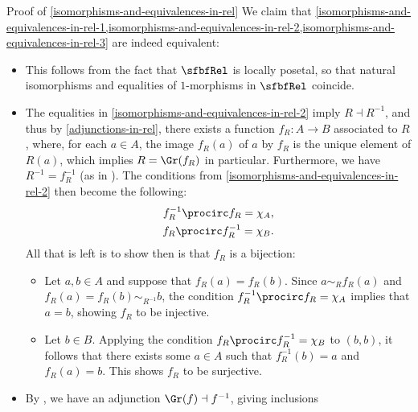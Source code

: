 \begin{Proof}{Proof of \cref{isomorphisms-and-equivalences-in-rel}}%
    We claim that \cref{isomorphisms-and-equivalences-in-rel-1,isomorphisms-and-equivalences-in-rel-2,isomorphisms-and-equivalences-in-rel-3} are indeed equivalent:
    \begin{itemize}
        \item{}This follows from the fact that $\sfbfRel$ is locally posetal, so that natural isomorphisms and equalities of $1$-morphisms in $\sfbfRel$ coincide.
        \item{}The equalities in \cref{isomorphisms-and-equivalences-in-rel-2} imply $R\dashv R^{-1}$, and thus by \cref{adjunctions-in-rel}, there exists a function $f_{R}\colon A\to B$ associated to $R$, where, for each $a\in A$, the image $f_{R}(a)$ of $a$ by $f_{R}$ is the unique element of $R(a)$, which implies $R=\Gr(f_{R})$ in particular. Furthermore, we have $R^{-1}=f^{-1}_{R}$ (as in ). The conditions from \cref{isomorphisms-and-equivalences-in-rel-2} then become the following:
            \begin{align*}
                f^{-1}_{R}\procirc f_{R} = \chi_{A},\\
                f_{R}\procirc f^{-1}_{R} = \chi_{B}.
            \end{align*}
            All that is left is to show then is that $f_{R}$ is a bijection:
            \begin{itemize}
                \item{}Let $a,b\in A$ and suppose that $f_{R}(a)=f_{R}(b)$. Since $a\sim_{R}f_{R}(a)$ and $f_{R}(a)=f_{R}(b)\sim_{R^{-1}}b$, the condition $f^{-1}_{R}\procirc f_{R}=\chi_{A}$ implies that $a=b$, showing $f_{R}$ to be injective.
                \item{}Let $b\in B$. Applying the condition $f_{R}\procirc f^{-1}_{R}=\chi_{B}$ to $(b,b)$, it follows that there exists some $a\in A$ such that $f^{-1}_{R}(b)=a$ and $f_{R}(a)=b$. This shows $f_{R}$ to be surjective.
            \end{itemize}
        \item{}By , we have an adjunction $\Gr(f)\dashv f^{-1}$, giving inclusions

\end{itemize}
\end{Proof}
